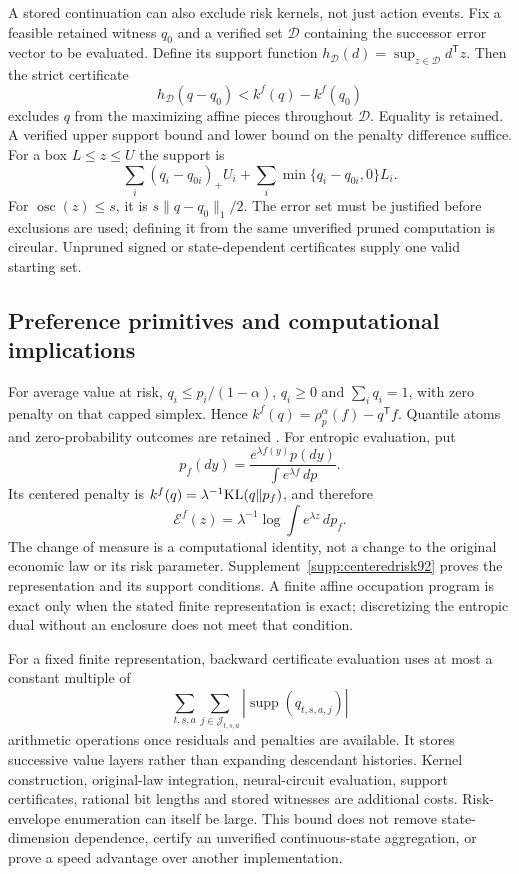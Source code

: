 A stored continuation can also exclude risk kernels, not just action events. Fix a feasible retained witness $q_0$ and a verified set $\mathcal D$ containing the successor error vector to be evaluated. Define its support function $h_{\mathcal D}(d)=\sup_{z\in\mathcal D}d^{\mathsf T}z$. Then the strict certificate
\begin{equation}\label{eq:kernel-cut92}
 h_{\mathcal D}(q-q_0)<k^f(q)-k^f(q_0)
\end{equation}
excludes $q$ from the maximizing affine pieces throughout $\mathcal D$. Equality is retained. A verified upper support bound and lower bound on the penalty difference suffice. For a box $L\le z\le U$ the support is
\[
 \sum_i(q_i-q_{0i})_+U_i
       +\sum_i\min\{q_i-q_{0i},0\}L_i.
\]
For $\operatorname{osc}(z)\le s$, it is $s\|q-q_0\|_1/2$. The error set must be justified before exclusions are used; defining it from the same unverified pruned computation is circular. Unpruned signed or state-dependent certificates supply one valid starting set.

\subsection{Preference primitives and computational implications}
For average value at risk, $q_i\le p_i/(1-\alpha)$, $q_i\ge0$ and $\sum_iq_i=1$, with zero penalty on that capped simplex. Hence $k^f(q)=\rho_p^\alpha(f)-q^{\mathsf T}f$. Quantile atoms and zero-probability outcomes are retained \citep{rockafellaruryasev2002}. For entropic evaluation, put
\[
 p_f(dy)=\frac{e^{\lambda f(y)}p(dy)}{\int e^{\lambda f}\,dp}.
\]
Its centered penalty is $k^f(q)=\lambda^{-1}{\rm KL}(q\Vert p_f)$, and therefore
\begin{equation}\label{eq:entropic-center92}
 \mathcal E^f(z)=\lambda^{-1}\log\int e^{\lambda z}\,dp_f.
\end{equation}
The change of measure is a computational identity, not a change to the original economic law or its risk parameter. Supplement~\ref{supp:centeredrisk92} proves the representation and its support conditions. A finite affine occupation program is exact only when the stated finite representation is exact; discretizing the entropic dual without an enclosure does not meet that condition.

For a fixed finite representation, backward certificate evaluation uses at most a constant multiple of
\[
 \sum_{t,s,a}\sum_{j\in\mathcal J_{t,s,a}}
       |\operatorname{supp}(q_{t,s,a,j})|
\]
arithmetic operations once residuals and penalties are available. It stores successive value layers rather than expanding descendant histories. Kernel construction, original-law integration, neural-circuit evaluation, support certificates, rational bit lengths and stored witnesses are additional costs. Risk-envelope enumeration can itself be large. This bound does not remove state-dimension dependence, certify an unverified continuous-state aggregation, or prove a speed advantage over another implementation.

